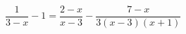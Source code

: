 \begin{ex}[type=equation]
	\begin{condition}
		$\dfrac{1}{3 - x} - 1 = \dfrac{2 - x}{x - 3} - \dfrac{7 - x}{3(x - 3)(x + 1)}$
	\end{condition}
\end{ex}